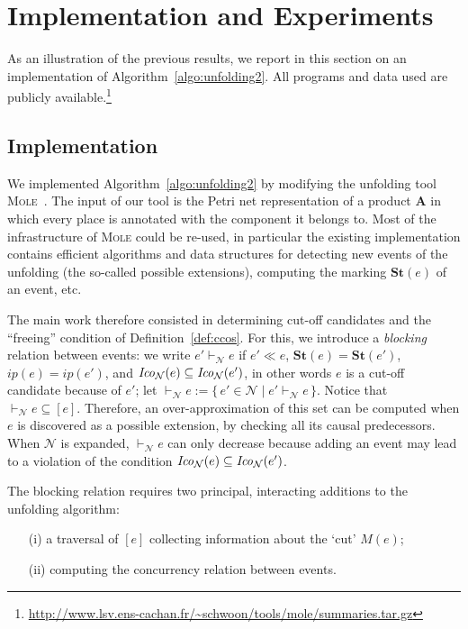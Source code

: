 \documentclass{llncs}
\def\prod{\mathbf{A}}
\def\N{\mathcal{N}}
\def\scause{\ll}
\newcommand{\st}[1]{\mathbf{St}(#1)}
\newcommand{\past}[1]{[#1]}
\newcommand{\ma}[1]{M(#1)}
\newcommand{\Coni}[2]{{\it Ico}_{#1}(#2)}
\def\blocks{\vdash_{\!\N}}
\def\rblocks{\mathord{\blocks}}
\begin{document}
\section{Implementation and Experiments}

\label{sec:exp}

As an illustration of the previous results, we report in this section on an implementation of 
Algorithm~\ref{algo:unfolding2}. All programs and data
used are publicly available.\footnote{\url{http://www.lsv.ens-cachan.fr/~schwoon/tools/mole/summaries.tar.gz}}

\subsection{Implementation}

We implemented Algorithm~\ref{algo:unfolding2} by modifying the
unfolding tool \textsc{Mole}~\cite{Mole}. The input of our tool is
the Petri net representation of a product $\prod$ in which every place
is annotated with the component it belongs to. Most of the infrastructure
of \textsc{Mole} could be re-used, in particular the existing implementation
contains efficient algorithms and data structures \cite{Esparza96}
for detecting new events
of the unfolding (the so-called possible extensions), computing the marking
$\st{e}$ of an event, etc.

The main work therefore consisted in determining cut-off candidates and
the ``freeing'' condition of Definition~\ref{def:ccos}.
For this, we introduce a \emph{blocking} relation between events: we write
$e'\blocks e$ if $e' \scause  e$, $\st{e}=\st{e'}$, $ip(e)=ip(e')$, and
$\Coni{\N}{e} \subseteq \Coni{\N}{e'}$, in other words $e$ is a cut-off
candidate because of $e'$; let $\rblocks{e}:=\{\,e'\in\N \mid e'\blocks e\,\}$.
Notice that $\rblocks{e}\subseteq\past{e}$.
Therefore, an over-approximation of this set can be computed when
$e$ is discovered as a possible extension, by checking all its causal
predecessors. When $\N$ is expanded, $\rblocks{e}$ can only decrease
because adding an event may lead to a violation of the condition
$\Coni{\N}{e}\subseteq\Coni{\N}{e'}$.

The blocking relation requires two principal, interacting additions
to the unfolding algorithm:
\begin{itemize}
\item[(i)] a traversal of $\past{e}$ collecting information about
  the `cut' $\ma{e}$;
\item[(ii)] computing the concurrency relation between events.
\end{itemize}
\end{document}
